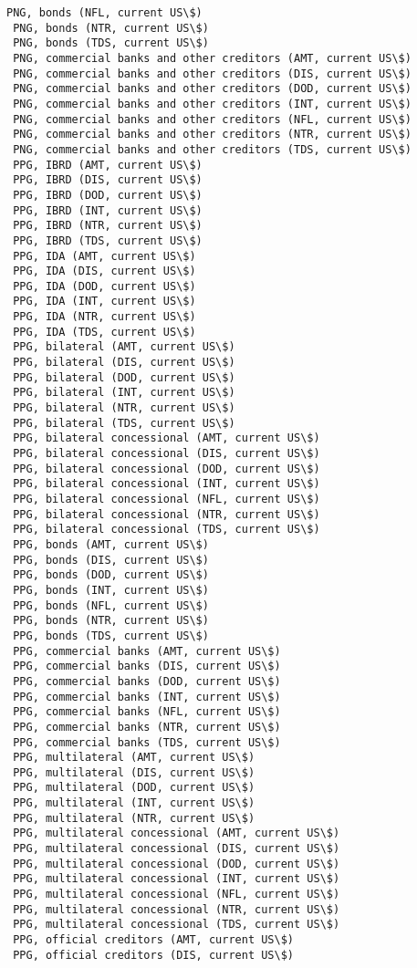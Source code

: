 \documentclass[11pt]{article}
\begin{document}
\begin{Verbatim}[commandchars=\\\{\}]
 PNG, bonds (NFL, current US\$)
 PNG, bonds (NTR, current US\$)
 PNG, bonds (TDS, current US\$)
 PNG, commercial banks and other creditors (AMT, current US\$)
 PNG, commercial banks and other creditors (DIS, current US\$)
 PNG, commercial banks and other creditors (DOD, current US\$)
 PNG, commercial banks and other creditors (INT, current US\$)
 PNG, commercial banks and other creditors (NFL, current US\$)
 PNG, commercial banks and other creditors (NTR, current US\$)
 PNG, commercial banks and other creditors (TDS, current US\$)
 PPG, IBRD (AMT, current US\$)
 PPG, IBRD (DIS, current US\$)
 PPG, IBRD (DOD, current US\$)
 PPG, IBRD (INT, current US\$)
 PPG, IBRD (NTR, current US\$)
 PPG, IBRD (TDS, current US\$)
 PPG, IDA (AMT, current US\$)
 PPG, IDA (DIS, current US\$)
 PPG, IDA (DOD, current US\$)
 PPG, IDA (INT, current US\$)
 PPG, IDA (NTR, current US\$)
 PPG, IDA (TDS, current US\$)
 PPG, bilateral (AMT, current US\$)
 PPG, bilateral (DIS, current US\$)
 PPG, bilateral (DOD, current US\$)
 PPG, bilateral (INT, current US\$)
 PPG, bilateral (NTR, current US\$)
 PPG, bilateral (TDS, current US\$)
 PPG, bilateral concessional (AMT, current US\$)
 PPG, bilateral concessional (DIS, current US\$)
 PPG, bilateral concessional (DOD, current US\$)
 PPG, bilateral concessional (INT, current US\$)
 PPG, bilateral concessional (NFL, current US\$)
 PPG, bilateral concessional (NTR, current US\$)
 PPG, bilateral concessional (TDS, current US\$)
 PPG, bonds (AMT, current US\$)
 PPG, bonds (DIS, current US\$)
 PPG, bonds (DOD, current US\$)
 PPG, bonds (INT, current US\$)
 PPG, bonds (NFL, current US\$)
 PPG, bonds (NTR, current US\$)
 PPG, bonds (TDS, current US\$)
 PPG, commercial banks (AMT, current US\$)
 PPG, commercial banks (DIS, current US\$)
 PPG, commercial banks (DOD, current US\$)
 PPG, commercial banks (INT, current US\$)
 PPG, commercial banks (NFL, current US\$)
 PPG, commercial banks (NTR, current US\$)
 PPG, commercial banks (TDS, current US\$)
 PPG, multilateral (AMT, current US\$)
 PPG, multilateral (DIS, current US\$)
 PPG, multilateral (DOD, current US\$)
 PPG, multilateral (INT, current US\$)
 PPG, multilateral (NTR, current US\$)
 PPG, multilateral concessional (AMT, current US\$)
 PPG, multilateral concessional (DIS, current US\$)
 PPG, multilateral concessional (DOD, current US\$)
 PPG, multilateral concessional (INT, current US\$)
 PPG, multilateral concessional (NFL, current US\$)
 PPG, multilateral concessional (NTR, current US\$)
 PPG, multilateral concessional (TDS, current US\$)
 PPG, official creditors (AMT, current US\$)
 PPG, official creditors (DIS, current US\$)

\end{Verbatim}
\end{document}
